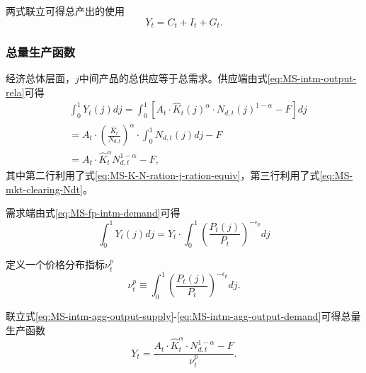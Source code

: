 两式联立可得总产出的使用
\begin{equation}
\label{MS-agg-accounting-indentity}
Y_t = C_t + I_t + G_t.
\end{equation}






\subsubsection{总量生产函数}
经济总体层面，$j$中间产品的总供应等于总需求。供应端由式\eqref{eq:MS-intm-output-rela}可得
\begin{equation}
\label{eq:MS-intm-agg-output-supply}
\begin{split}
&\int_{0}^{1} Y_t(j) dj = \int_{0}^1 \left[
A_t \cdot \hat{K}_t(j)^{\alpha} \cdot N_{d,t}(j)^{1-\alpha} -F
\right] dj \\
&= A_t \cdot \left(\frac{\hat{K}_t}{N_{d,t}}\right)^{\alpha} \cdot \int_{0}^1 N_{d,t}(j) dj - F \\
&= A_t \cdot \hat{K}_t^{\alpha} N_{d,t}^{1-\alpha} -F,
\end{split}
\end{equation}
其中第二行利用了式\eqref{eq:MS-K-N-ration-j-ration-equiv}，第三行利用了式\eqref{eq:MS-mkt-clearing-Ndt}。

需求端由式\eqref{eq:MS-fp-intm-demand}可得
\begin{equation}
\label{eq:MS-intm-agg-output-demand}
\int^{1}_0 Y_t(j) dj = Y_t \cdot \int_{0}^{1} \left(\frac{P_t(j)}{P_t}\right)^{-\epsilon_p} dj
\end{equation}

定义一个价格分布指标$\nu^p_t$
\begin{equation}
\label{eq:MS-price-dispersion-index}
\nu_t^p \equiv \int_{0}^{1} \left(\frac{P_t(j)}{P_t}\right)^{-\epsilon_p} dj.
\end{equation}

联立式\eqref{eq:MS-intm-agg-output-supply}-\eqref{eq:MS-intm-agg-output-demand}可得总量生产函数
\begin{equation}
\label{eq:MS-agg-prod-function}
Y_t = \frac{A_t \cdot \hat{K}_t^{\alpha} \cdot N_{d,t}^{1-\alpha} - F}{\nu^p_t}.
\end{equation}


